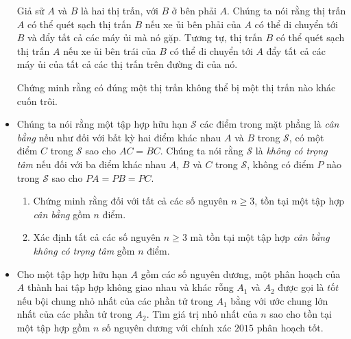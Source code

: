 \documentclass[11pt]{scrartcl}
\begin{document}
\begin{itemize}[label=, leftmargin=0em, itemsep=-0em]
\begin{btvn}
        Giả sử $A$ và $B$ là hai thị trấn, với $B$ ở bên phải $A$. Chúng ta nói rằng thị trấn $A$ có thể quét sạch thị trấn $B$ nếu xe ủi bên phải của $A$ có thể di chuyển tới $B$ và đẩy tất cả các máy ủi mà nó gặp. Tương tự, thị trấn $B$ có thể quét sạch thị trấn $A$ nếu xe ủi bên trái của $B$ có thể di chuyển tới $A$ đẩy tất cả các máy ủi của tất cả các thị trấn trên đường đi của nó.

        
        Chứng minh rằng có đúng một thị trấn không thể bị một thị trấn nào khác cuốn trôi.
    \end{btvn}
    
    \item \begin{btvn}
        Chúng ta nói rằng một tập hợp hữu hạn $\mathcal{S}$ các điểm trong mặt phẳng là \textit{cân bằng} nếu như đối với bất kỳ hai điểm khác nhau $A$ và $B$ trong $\mathcal{S}$, có một điểm $C$ trong $\mathcal{S}$ sao cho $AC=BC$. Chúng ta nói rằng $\mathcal{S}$ là \textit{không có trọng tâm} nếu đối với ba điểm khác nhau $A$, $B$ và $C$ trong $\mathcal{S}$, không có điểm $P$ nào trong $\mathcal{S}$ sao cho $PA=PB=PC$.
        \begin{enumerate}[label=(\alph*)]
            \item Chứng minh rằng đối với tất cả các số nguyên $n\geq 3$, tồn tại một tập hợp \textit{cân bằng} gồm $n$ điểm.
            \item Xác định tất cả các số nguyên $n\geq 3$ mà tồn tại một tập hợp \textit{cân bằng} \textit{không có trọng tâm} gồm $n$ điểm.
        \end{enumerate}
    \end{btvn}

    \item \begin{btvn}
        Cho một tập hợp hữu hạn $A$ gồm các số nguyên dương, một phân hoạch của $A$ thành hai tập hợp không giao nhau và khác rỗng $A_1$ và $A_2$ được gọi là $\textit{tốt}$ nếu bội chung nhỏ nhất của các phần tử trong $A_1$ bằng với ước chung lớn nhất của các phần tử trong $A_2$. Tìm giá trị nhỏ nhất của $n$ sao cho tồn tại một tập hợp gồm $n$ số nguyên dương với chính xác $2015$ phân hoạch tốt.
    \end{btvn}


\end{itemize}
\end{document}
